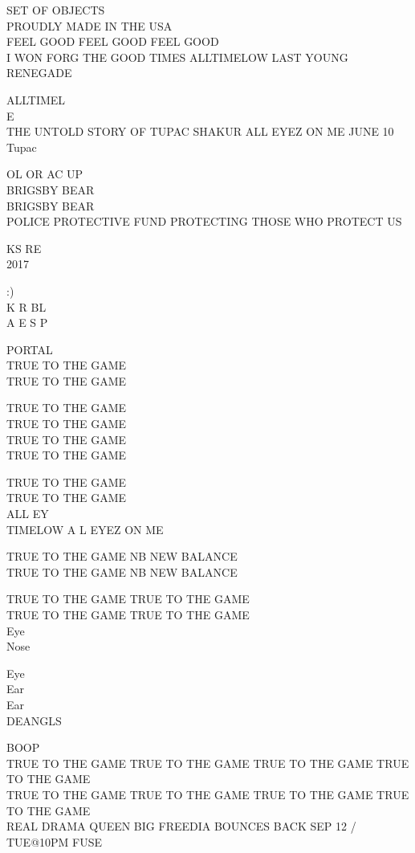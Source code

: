 \documentclass[10pt,letterpaper]{article}
\begin{document}
SET OF OBJECTS\\
PROUDLY MADE IN THE USA\\
FEEL GOOD FEEL GOOD FEEL GOOD\\
I WON FORG THE GOOD TIMES ALLTIMELOW LAST YOUNG RENEGADE

ALLTIMEL\\
E\\
THE UNTOLD STORY OF TUPAC SHAKUR ALL EYEZ ON  ME JUNE 10\\
Tupac

OL OR AC UP\\
BRIGSBY BEAR\\
BRIGSBY BEAR\\
POLICE PROTECTIVE FUND PROTECTING THOSE WHO PROTECT US

KS RE\\
2017

:)\\
K R BL\\
A E S P

PORTAL\\
TRUE TO THE GAME\\
TRUE TO THE GAME

TRUE TO THE GAME\\
TRUE TO THE GAME\\
TRUE TO THE GAME\\
TRUE TO THE GAME

TRUE TO THE GAME\\
TRUE TO THE GAME\\
ALL EY\\
TIMELOW A L EYEZ ON ME

TRUE TO THE GAME NB NEW BALANCE\\
TRUE TO THE GAME NB NEW BALANCE

TRUE TO THE GAME TRUE TO THE GAME\\
TRUE TO THE GAME TRUE TO THE GAME\\
Eye\\
Nose

Eye\\
Ear\\
Ear\\
DEANGLS

BOOP\\
TRUE TO THE GAME TRUE TO THE GAME TRUE TO THE GAME TRUE TO THE GAME\\
TRUE TO THE GAME TRUE TO THE GAME TRUE TO THE GAME TRUE TO THE GAME\\
REAL DRAMA QUEEN BIG FREEDIA BOUNCES BACK SEP 12 / TUE@10PM FUSE
\end{document}
